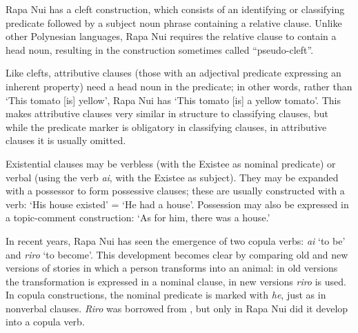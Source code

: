 Rapa Nui has a cleft construction, which consists of an identifying or classifying predicate followed by a subject noun phrase containing a relative clause. Unlike other Polynesian languages, Rapa Nui requires the relative clause to contain a head noun, resulting in the construction sometimes called “pseudo-cleft”.

Like clefts, attributive clauses (those with an adjectival predicate expressing an inherent property) need a head noun in the predicate; in other words, rather than ‘This tomato [is] yellow’, Rapa Nui has ‘This tomato [is] a yellow tomato’. This makes attributive clauses very similar in structure to classifying clauses, but while the predicate marker is obligatory in classifying clauses, in attributive clauses it is usually omitted.

Existential clauses may be verbless (with the Existee as nominal predicate) or verbal (using the verb \textit{ai}, with the Existee as subject). They may be expanded with a possessor to form possessive clauses; these are usually constructed with a verb: ‘His house existed’ = ‘He had a house’. Possession may also be expressed in a topic-comment construction: ‘As for him, there was a house.’

In recent years, Rapa Nui has seen the emergence of two copula verbs: \textit{ai} ‘to be’ and \textit{riro} ‘to become’. This development becomes clear by comparing old and new versions of stories in which a person transforms into an animal: in old versions the transformation is expressed in a nominal clause, in new versions \textit{riro} is used. In copula constructions, the nominal predicate is marked with \textit{he}, just as in nonverbal clauses. \textit{Riro} was borrowed from , but only in Rapa Nui did it develop into a copula verb.
